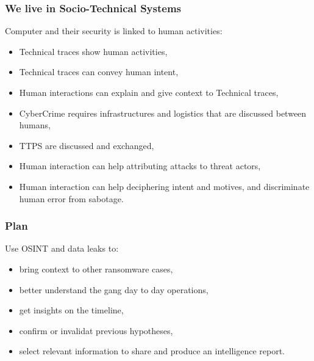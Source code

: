 \begin{frame}
    \frametitle{We live in Socio-Technical Systems}
    Computer and their security is linked to human activities:

    \begin{itemize}
        \item Technical traces show human activities,
        \item Technical traces can convey human intent,
        \item Human interactions can explain and give context to Technical traces,
        \item CyberCrime requires infrastructures and logistics that are discussed between humans,
        \item TTPS are discussed and exchanged,
        \item Human interaction can help attributing attacks to threat actors,
        \item Human interaction can help deciphering intent and motives, and discriminate human error from sabotage.
    \end{itemize}
\end{frame}


\begin{frame}
    \frametitle{Plan}
        Use OSINT and data leaks to:
    \begin{itemize}
        \item bring context to other ransomware cases,
        \item better understand the gang day to day operations,
        \item get insights on the timeline,
        \item confirm or invalidat previous hypotheses,
        \item select relevant information to share and produce an intelligence report.
    \end{itemize}

\end{frame}

